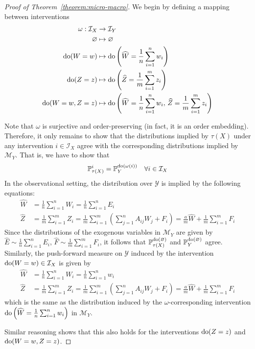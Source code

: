 \medskip

\begin{proof}[Proof of Theorem~\ref{theorem:micro-macro}]
We begin by defining a mapping between interventions
\begin{align*}
\omega : \mathcal{I}_X &\rightarrow \mathcal{I}_Y \\
\varnothing &\mapsto \varnothing \\
\operatorname{do}(W= w)&\mapsto \operatorname{do}\left(\widehat{W} = \frac{1}{n}\sum_{i=1}^n w_i\right) \\
\operatorname{do}(Z= z)&\mapsto \operatorname{do}\left(\widehat{Z} = \frac{1}{m}\sum_{i=1}^m z_i\right) \\
\operatorname{do}(W=w, Z=z)&\mapsto \operatorname{do}\left(\widehat{W} = \frac{1}{n}\sum_{i=1}^n w_i,\, \widehat{Z} = \frac{1}{m}\sum_{i=1}^m z_i\right)
\end{align*}

Note that $\omega$ is surjective and order-preserving (in fact, it is an order embedding).
Therefore, it only remains to show that the distributions implied by $\tau(X)$ under any intervention $i\in\mathcal{I}_X$ agree with the corresponding distributions implied by $\mathcal{M}_Y$.
That is, we have to show that
\[ \mathbb{P}_{\tau(X)}^{i} = \mathbb{P}_{Y}^{\operatorname{do}(\omega(i))} \quad \forall i\in\mathcal{I}_X \]
%
In the observational setting, the distribution over $\mathcal{Y}$ is implied by the following equations:
%
\begin{align*}
\widehat{W} &= \frac{1}{n}\sum_{i=1}^n W_i = \frac{1}{n}\sum_{i=1}^n E_i \\
\widehat{Z} &= \frac{1}{m}\sum_{i=1}^m Z_i =  \frac{1}{m}\sum_{i=1}^m \left( \sum_{j=1}^n A_{ij}W_j  + F_i\right) = \frac{a}{m}\widehat{W} +  \frac{1}{m}\sum_{i=1}^m F_i
\end{align*}
%
Since the distributions of the exogenous variables in $\mathcal{M}_Y$ are given by $\widehat{E} \sim \frac{1}{n}\sum_{i=1}^n E_i$, $\widehat{F} \sim \frac{1}{m}\sum_{i=1}^m F_i$, it follows that $\mathbb{P}_{\tau(X)}^{\operatorname{do}(\varnothing)}$  and $\mathbb{P}_{Y}^{\operatorname{do}(\varnothing)}$ agree. Similarly, the push-forward measure on $\mathcal{Y}$ induced by the intervention $\operatorname{do}(W=w)\in\mathcal{I}_X$ is given by
%
\begin{align*}
\widehat{W} &= \frac{1}{n}\sum_{i=1}^n W_i = \frac{1}{n}\sum_{i=1}^n w_i \\
\widehat{Z} &= \frac{1}{m}\sum_{i=1}^m Z_i =  \frac{1}{m}\sum_{i=1}^m \left( \sum_{j=1}^n A_{ij}W_j  + F_i\right) = \frac{a}{m}\widehat{W} +  \frac{1}{m}\sum_{i=1}^m F_i
\end{align*}
which is the same as the distribution induced by the $\omega$-corresponding intervention $\operatorname{do}\left(\widehat{W} = \frac{1}{n}\sum_{i=1}^n w_i\right)$ in $\mathcal{M}_Y$.

Similar reasoning shows that this also holds for the interventions $\operatorname{do}(Z=z)$ and $\operatorname{do}(W=w, Z=z)$.

\end{proof}

